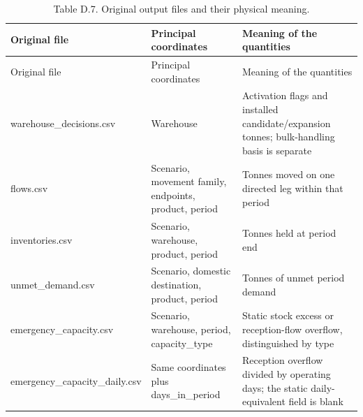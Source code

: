 \documentclass[
  english,
  11pt,
  a4paper,
]{article}
\begin{document}
\begin{longtable}[]{@{}
  >{\raggedright\arraybackslash}p{}
  >{\raggedright\arraybackslash}p{}
  >{\raggedright\arraybackslash}p{}@{}}
\caption{Table D.7. Original output files and their physical
meaning.}\tabularnewline
\toprule\noalign{}
\begin{minipage}[b]{\linewidth}\raggedright
Original file
\end{minipage} & \begin{minipage}[b]{\linewidth}\raggedright
Principal coordinates
\end{minipage} & \begin{minipage}[b]{\linewidth}\raggedright
Meaning of the quantities
\end{minipage} \\
\midrule\noalign{}
\endfirsthead
\toprule\noalign{}
\begin{minipage}[b]{\linewidth}\raggedright
Original file
\end{minipage} & \begin{minipage}[b]{\linewidth}\raggedright
Principal coordinates
\end{minipage} & \begin{minipage}[b]{\linewidth}\raggedright
Meaning of the quantities
\end{minipage} \\
\midrule\noalign{}
\endhead
\bottomrule\noalign{}
\endlastfoot
warehouse\_decisions.csv & Warehouse & Activation flags and installed
candidate/expansion tonnes; bulk-handling basis is separate \\
flows.csv & Scenario, movement family, endpoints, product, period &
Tonnes moved on one directed leg within that period \\
inventories.csv & Scenario, warehouse, product, period & Tonnes held at
period end \\
unmet\_demand.csv & Scenario, domestic destination, product, period &
Tonnes of unmet period demand \\
emergency\_capacity.csv & Scenario, warehouse, period, capacity\_type &
Static stock excess or reception-flow overflow, distinguished by type \\
emergency\_capacity\_daily.csv & Same coordinates plus days\_in\_period
& Reception overflow divided by operating days; the static
daily-equivalent field is blank \\
\end{longtable}
\end{document}
